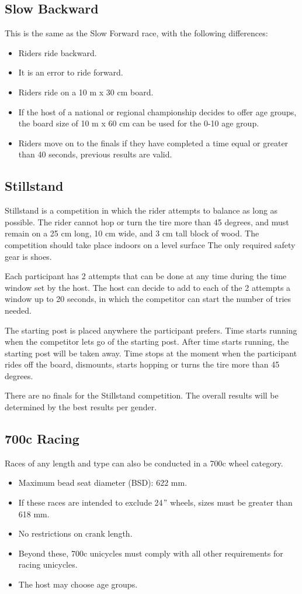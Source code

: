\subsection{Slow Backward}
This is the same as the Slow Forward race, with the following differences:
\begin{itemize}
\item Riders ride backward.
\item It is an error to ride forward.
\item Riders ride on a 10 m x 30 cm board.
\item If the host of a national or regional championship decides to offer age groups, the board size of 10 m x 60 cm can be used for the 0-10 age group.
\item Riders move on to the finals if they have completed a time equal or greater than 40 seconds, previous results are valid.
\end{itemize}


\subsection{Stillstand}
Stillstand is a competition in which the rider attempts to balance as long as possible.
The rider cannot hop or turn the tire more than 45 degrees, and must remain on a 25 cm long, 10 cm wide, and 3 cm tall block of wood.
The competition should take place indoors on a level surface
The only required safety gear is shoes.

Each participant has 2 attempts that can be done at any time during the time window set by the host.
The host can decide to add to each of the 2 attempts a window up to 20 seconds, in which the competitor can start the number of tries needed.

The starting post is placed anywhere the participant prefers.
Time starts running when the competitor lets go of the starting post.
After time starts running, the starting post will be taken away.
Time stops at the moment when the participant rides off the board, dismounts, starts hopping or turns the tire more than 45 degrees.

There are no finals for the Stillstand competition.
The overall results will be determined by the best results per gender.

\subsection{700c Racing}
Races of any length and type can also be conducted in a 700c wheel category.
\begin{itemize}
\item Maximum bead seat diameter (BSD): 622 mm.
\item If these races are intended to exclude 24$"$ wheels, sizes must be greater than 618 mm.
\item No restrictions on crank length.
\item Beyond these, 700c unicycles must comply with all other requirements for racing unicycles.
\item The host may choose age groups.
\end{itemize}

